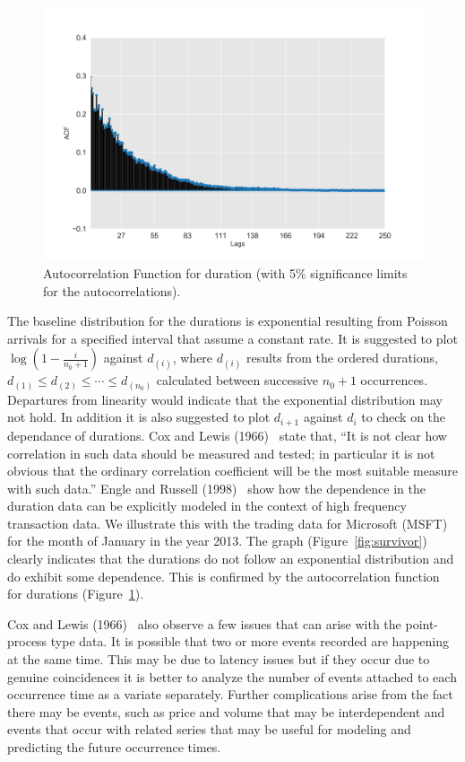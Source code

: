 	\begin{figure}[!ht]
	\centering
	 \includegraphics[width=\textwidth]{chapters/chapter_advanced/figures/afc_duration.png}
	\caption{Autocorrelation Function for duration (with 5\% significance limits for the autocorrelations). \label{fig:duration}}
	\end{figure}
 
 The baseline distribution for the durations is exponential resulting from Poisson arrivals for a specified interval that assume a constant rate. It is suggested to plot $\log(1 - \frac{i}{n_0+1})$ against $d_{(i)}$, where $d_{(i)}$ results from the ordered durations, $d_{(1)} \leq d_{(2)} \leq \cdots \leq d_{(n_0)}$ calculated between successive $n_0 + 1$ occurrences. Departures from linearity would indicate that the exponential distribution may not hold. In addition it is also suggested to plot $d_{i+1}$ against $d_i$ to check on the dependance of durations. Cox and Lewis (1966)~\cite[p.14]{cox1966} state that, ``It is not clear how correlation in such data should be measured and tested; in particular it is not obvious that the ordinary correlation coefficient will be the most suitable measure with such data.'' Engle and Russell (1998)~\cite{engle1998} show how the dependence in the duration data can be explicitly modeled in the context of high frequency transaction data. We illustrate this with the trading data for Microsoft (MSFT) for the month of January in the year 2013. The graph (Figure~\ref{fig:survivor}) clearly indicates that the durations do not follow an exponential distribution and do exhibit some dependence. This is confirmed by the autocorrelation function for durations (Figure~\ref{fig:duration}).


Cox and Lewis (1966)~\cite{cox1966} also observe a few issues that can arise with the point-process type data. It is possible that two or more events recorded are happening at the same time. This may be due to latency issues but if they occur due to genuine coincidences it is better to analyze the number of events attached to each occurrence time as a variate separately. Further complications arise from the fact there may be events, such as price and volume that may be interdependent and events that occur with related series that may be useful for modeling and predicting the future occurrence times.



